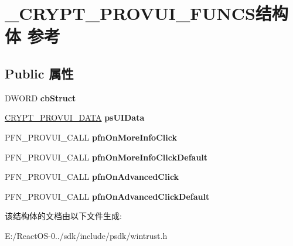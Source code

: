 \hypertarget{struct___c_r_y_p_t___p_r_o_v_u_i___f_u_n_c_s}{}\section{\+\_\+\+C\+R\+Y\+P\+T\+\_\+\+P\+R\+O\+V\+U\+I\+\_\+\+F\+U\+N\+C\+S结构体 参考}
\label{struct___c_r_y_p_t___p_r_o_v_u_i___f_u_n_c_s}
\subsection*{Public 属性}
\begin{DoxyCompactItemize}
\item 
\mbox{\label{struct___c_r_y_p_t___p_r_o_v_u_i___f_u_n_c_s_a9de29b61599d4beb69b0ea1f410238c6}} 
D\+W\+O\+RD {\bfseries cb\+Struct}
\item 
\mbox{\label{struct___c_r_y_p_t___p_r_o_v_u_i___f_u_n_c_s_acc8be3948293c76238a2165f71b17329}} 
\hyperlink{struct___c_r_y_p_t___p_r_o_v_u_i___d_a_t_a}{C\+R\+Y\+P\+T\+\_\+\+P\+R\+O\+V\+U\+I\+\_\+\+D\+A\+TA} {\bfseries ps\+U\+I\+Data}
\item 
\mbox{\label{struct___c_r_y_p_t___p_r_o_v_u_i___f_u_n_c_s_a2d0d66db8a10c7cf68639a9a446ec23d}} 
P\+F\+N\+\_\+\+P\+R\+O\+V\+U\+I\+\_\+\+C\+A\+LL {\bfseries pfn\+On\+More\+Info\+Click}
\item 
\mbox{\label{struct___c_r_y_p_t___p_r_o_v_u_i___f_u_n_c_s_ace7f51fc7971f2962caceba58be01c4e}} 
P\+F\+N\+\_\+\+P\+R\+O\+V\+U\+I\+\_\+\+C\+A\+LL {\bfseries pfn\+On\+More\+Info\+Click\+Default}
\item 
\mbox{\label{struct___c_r_y_p_t___p_r_o_v_u_i___f_u_n_c_s_a6a0a0cb1356aa797c147f37a3f1e8bcf}} 
P\+F\+N\+\_\+\+P\+R\+O\+V\+U\+I\+\_\+\+C\+A\+LL {\bfseries pfn\+On\+Advanced\+Click}
\item 
\mbox{\label{struct___c_r_y_p_t___p_r_o_v_u_i___f_u_n_c_s_a1bcd3e7f70bab1456b950d1a88fd4ca6}} 
P\+F\+N\+\_\+\+P\+R\+O\+V\+U\+I\+\_\+\+C\+A\+LL {\bfseries pfn\+On\+Advanced\+Click\+Default}
\end{DoxyCompactItemize}


该结构体的文档由以下文件生成\+:\begin{DoxyCompactItemize}
\item 
E\+:/\+React\+O\+S-\/0../sdk/include/psdk/wintrust.\+h\end{DoxyCompactItemize}
